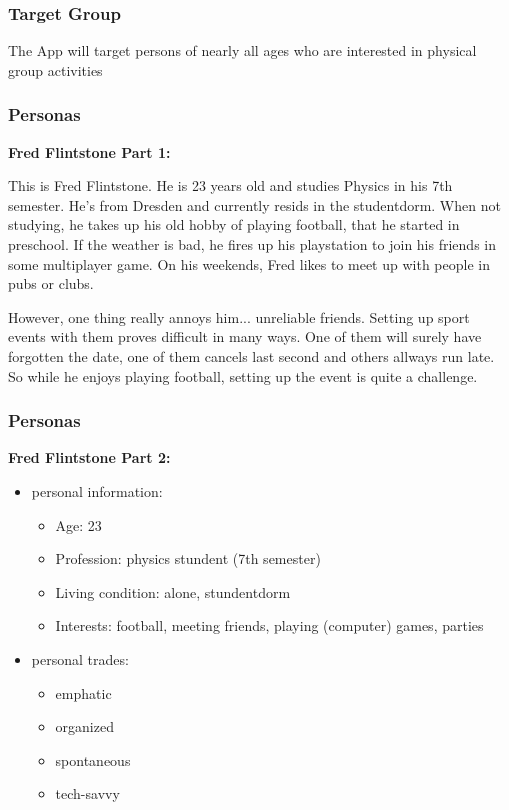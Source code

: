 \documentclass[aspectratio=169]{beamer}
\begin{document}
\begin{frame}   
\frametitle{Target Group}
The App will target persons of nearly all ages who are interested in physical group
activities
\end{frame}

\begin{frame}   
	\frametitle{Personas}{\textbf{Fred Flintstone Part 1:}}

	This is Fred Flintstone. He is 23 years old and studies Physics in his 7th semester. 
He's from Dresden and currently resids in the studentdorm. 
When not studying, he takes up his old hobby of playing football, that he started in preschool. If the weather is bad, he fires up his playstation to join his friends in some multiplayer game.
On his weekends, Fred likes to meet up with people in pubs or clubs.

However, one thing really annoys him... unreliable friends. Setting up sport events with them proves difficult in many ways.
One of them will surely have forgotten the date, one of them cancels last second and others allways run late.
So while he enjoys playing football, setting up the event is quite a challenge.
\end{frame}

\begin{frame}   
	\frametitle{Personas}{\textbf{Fred Flintstone Part 2:}}

\begin{itemize}
	\item personal information:
	\begin{itemize}
		\item Age: 23
		\item Profession: physics stundent (7th semester)
		\item Living condition: alone, stundentdorm
		\item Interests: football, meeting friends, playing (computer) games, parties
	\end{itemize}
	\item personal trades:
	\begin{itemize}
		\item emphatic
		\item organized
		\item spontaneous
		\item tech-savvy
\end{itemize}
\end{itemize}

\end{frame}
\end{document}
